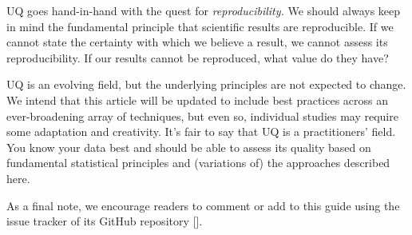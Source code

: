UQ goes hand-in-hand with the quest for \emph{reproducibility.}  We should always keep in mind the fundamental principle that scientific results are reproducible.  If we cannot state the certainty with which we believe a result, we cannot assess its reproducibility.  If our results cannot be reproduced, what value do they have?

UQ is an evolving field, but the underlying principles are not expected to change.
We intend that this article will be updated to include best practices across an ever-broadening array of techniques, but even so, individual studies may require some adaptation and creativity.
It's fair to say that UQ is a practitioners' field.  You know your data best and should be able to assess its quality based on fundamental statistical principles and (variations of) the approaches described here.

As a final note, we encourage readers to comment or add to this guide using the issue tracker of its GitHub repository [\githubrepository].
